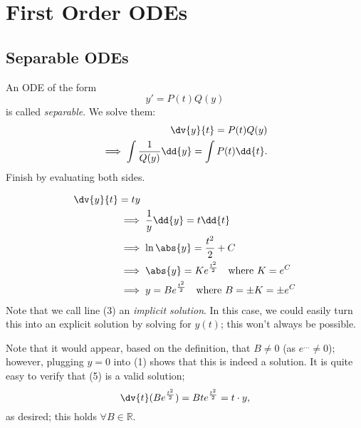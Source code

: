 
\section{First Order ODEs}

\subsection{Separable ODEs}

\begin{definition}
    An ODE of the form \[y' = P(t)Q(y)\] is called \emph{separable}. We solve them:
    \begin{align*}
        \dv{y}{t} = P(t) Q(y)\\
        \implies \int \frac{1}{Q(y)}  \dd{y} = \int P(t) \dd{t}.
    \end{align*}
    Finish by evaluating both sides.
\end{definition}

\begin{example}
    \begin{align}
        \dv{y}{t} &= ty\\
        &\implies \frac{1}{y}\dd{y} = t \dd{t}\\
        &\implies \ln \abs{y} = \frac{t^2}{2} + C\\
        &\implies \abs{y} = Ke^{\frac{t^2}{2}} \quad \text{where } K = e^{C}\\
        &\implies y= B e^{\frac{t^2}{2}} \quad \text{where } B = \pm K = \pm e^{C}
    \end{align}
    Note that we call line (3) an \emph{implicit solution}. In this case, we could easily turn this into an explicit solution by solving for $y(t)$; this won't always be possible.

    Note that it would appear, based on the definition, that $B \neq 0$ (as $e^{\dots} \neq 0$); however, plugging $y = 0$ into (1) shows that this is indeed a solution. It is quite easy to verify that (5) is a valid solution; \[
    \dv{t}(Be^{\frac{t^2}{2}}) = B te^{\frac{t^2}{2}} = t \cdot y,    
    \]
    as desired; this holds $\forall B \in \mathbb{R}$.
\end{example}


